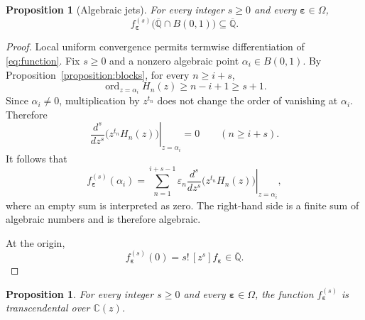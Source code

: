 \documentclass[10pt,a4paper]{amsart}
\newtheorem{proposition}[theorem]{Proposition}
\numberwithin{equation}{section}
\newcommand{\C}{\mathbb C}
\newcommand{\Qbar}{\overline{\mathbb Q}}
\newcommand{\ord}{\operatorname{ord}}
\newcommand{\B}{B(0,1)}
\begin{document}
\begin{proposition}[Algebraic jets]\label{proposition:values}
For every integer $s\geq0$ and every
$\boldsymbol\varepsilon\in\Omega$,
\[
        f_{\boldsymbol\varepsilon}^{(s)}
        \bigl(\Qbar\cap\B\bigr)
        \subseteq\Qbar.
\]
\end{proposition}

\begin{proof}
Local uniform convergence permits termwise differentiation of
\eqref{eq:function}. Fix $s\geq0$ and a nonzero algebraic point
$\alpha_i\in\B$. By Proposition~\ref{proposition:blocks}, for every
$n\geq i+s$,
\[
        \ord_{z=\alpha_i}H_n(z)
        \geq n-i+1
        \geq s+1.
\]
Since $\alpha_i\neq0$, multiplication by $z^{t_n}$ does not change the
order of vanishing at $\alpha_i$. Therefore
\[
        \left.
        \frac{d^s}{dz^s}\bigl(z^{t_n}H_n(z)\bigr)
        \right|_{z=\alpha_i}
        =0
        \qquad(n\geq i+s).
\]
It follows that
\begin{equation}\label{eq:finite-jet-sum}
        f_{\boldsymbol\varepsilon}^{(s)}(\alpha_i)
        =
        \sum_{n=1}^{i+s-1}
        \varepsilon_n
        \left.
        \frac{d^s}{dz^s}\bigl(z^{t_n}H_n(z)\bigr)
        \right|_{z=\alpha_i},
\end{equation}
where an empty sum is interpreted as zero. The right-hand side is a finite
sum of algebraic numbers and is therefore algebraic.

At the origin,
\[
        f_{\boldsymbol\varepsilon}^{(s)}(0)
        =
        s!\,[z^s]f_{\boldsymbol\varepsilon}
        \in\Qbar.
\]
\end{proof}

\begin{proposition}\label{proposition:transcendence}
For every integer $s\geq 0$ and every
$\boldsymbol{\varepsilon}\in\Omega$, the function
$f_{\boldsymbol{\varepsilon}}^{(s)}$ is transcendental over $\C(z)$.
\end{proposition}
\end{document}
